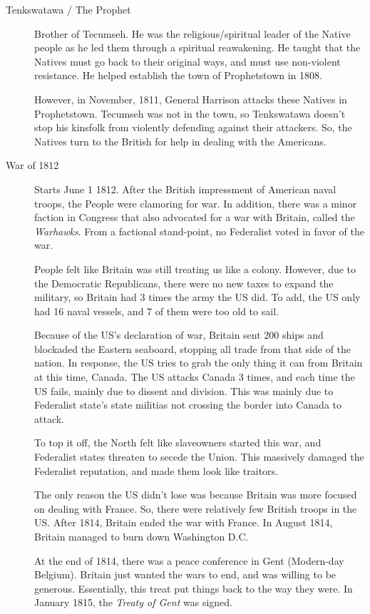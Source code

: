 \begin{description}
\item[Tenkswatawa / The Prophet] Brother of Tecumseh.
  He was the religious/spiritual leader of the Native people as he led them through a spiritual reawakening.
  He taught that the Natives must go back to their original ways, and must use non-violent resistance.
  He helped establish the town of Prophetstown in 1808.

  However, in November, 1811, General Harrison attacks these Natives in Prophetstown.
  Tecumseh was not in the town, so Tenkswatawa doesn't stop his kinsfolk from violently defending against their attackers.
  So, the Natives turn to the British for help in dealing with the Americans.

\item[War of 1812] Starts June 1 1812.
  After the British impressment of American naval troops, the People were clamoring for war.
  In addition, there was a minor faction in Congress that also advocated for a war with Britain, called the \emph{Warhawks}.
  From a factional stand-point, no Federalist voted in favor of the war.

  People felt like Britain was still treating us like a colony.
  However, due to the Democratic Republicans, there were no new taxes to expand the military, so Britain had 3 times the army the US did.
  To add, the US only had 16 naval vessels, and 7 of them were too old to sail.

  Because of the US's declaration of war, Britain sent 200 ships and blockaded the Eastern seaboard, stopping all trade from that side of the nation.
  In response, the US tries to grab the only thing it can from Britain at this time, Canada.
  The US attacks Canada 3 times, and each time the US fails, mainly due to dissent and division.
  This was mainly due to Federalist state's state militias not crossing the border into Canada to attack.

  To top it off, the North felt like slaveowners started this war, and Federalist states threaten to secede the Union.
  This massively damaged the Federalist reputation, and made them look like traitors.

  The only reason the US didn't lose was because Britain was more focused on dealing with France.
  So, there were relatively few British troops in the US.\@
  After 1814, Britain ended the war with France.
  In August 1814, Britain managed to burn down Washington D.C.\@

  At the end of 1814, there was a peace conference in Gent (Modern-day Belgium).
  Britain just wanted the wars to end, and was willing to be generous.
  Essentially, this treat put things back to the way they were.
  In January 1815, the \emph{Treaty of Gent} was signed.


\end{description}
